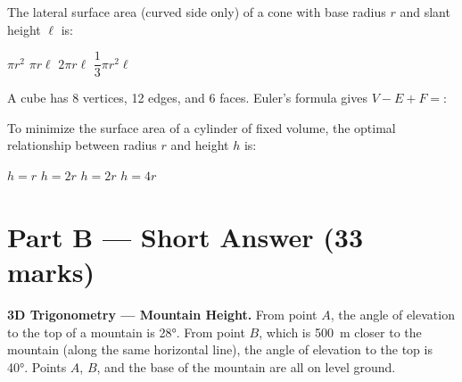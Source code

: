 \documentclass[addpoints]{exam}
\begin{document}
\begin{questions}
\question[1]
The lateral surface area (curved side only) of a cone with base radius $r$ and slant height $\ell$ is:
\begin{choices}
    \choice $\pi r^2$
    \correctchoice $\pi r \ell$
    \choice $2\pi r \ell$
    \choice $\dfrac{1}{3}\pi r^2 \ell$
\end{choices}
\vspace{3mm}

\question[1]
A cube has 8 vertices, 12 edges, and 6 faces. Euler's formula gives $V - E + F = $:
\begin{choices}
\end{choices}
\vspace{3mm}

\question[1]
To minimize the surface area of a cylinder of fixed volume, the optimal relationship between radius $r$ and height $h$ is:
\begin{choices}
    \choice $h = r$
    \choice $h = 2r$
    \correctchoice $h = 2r$
    \choice $h = 4r$
\end{choices}
\vspace{3mm}

\section*{Part B --- Short Answer (33 marks)}

\vspace{5mm}

\question[6]
\textbf{3D Trigonometry --- Mountain Height.}
From point $A$, the angle of elevation to the top of a mountain is \ang{28}. From point $B$, which is \SI{500}{m} closer to the mountain (along the same horizontal line), the angle of elevation to the top is \ang{40}. Points $A$, $B$, and the base of the mountain are all on level ground.



\end{questions}
\end{document}
